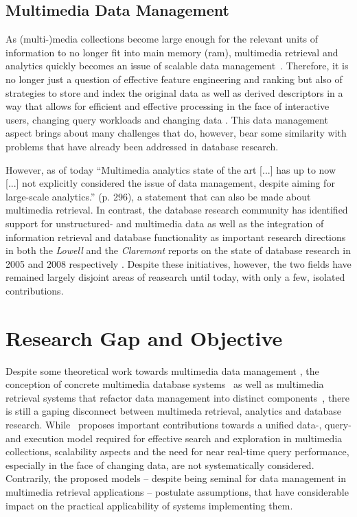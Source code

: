 \subsection{Multimedia Data Management}

As (multi-)media collections become large enough for the relevant units of information to no longer fit into main memory (\acrshort{ram}), multimedia retrieval and analytics quickly becomes an issue of scalable data management~\cite{Jonson:2016Ten,Pouyanfar:2018}. Therefore, it is no longer just a question of effective feature engineering and ranking but also of strategies to store and index the original data as well as derived descriptors in a way that allows for efficient and effective processing in the face of interactive users, changing query workloads and changing data \cite{Smeulders:2000Content}. This data management aspect brings about many challenges that do, however, bear some similarity with problems that have already been addressed in database research.

However, as of today ``Multimedia analytics state of the art [...] has up to now [...] not explicitly considered the issue of data management, despite aiming for large-scale analytics.'' \cite{Jonson:2016Ten} (p. 296), a statement that can also be made about multimedia retrieval. In contrast, the database research community has identified support for unstructured- and multimedia data as well as the integration of information retrieval and database functionality as important research directions in both the \emph{Lowell} and the \emph{Claremont} reports on the state of database research in 2005 and 2008 respectively \cite{Abiteboul:2005Lowell,Agrawal:2008Claremont}. Despite these initiatives, however, the two fields have remained largely disjoint areas of reasearch until today, with only a few, isolated contributions.

\section{Research Gap and Objective}
\label{section:research_gap}

Despite some theoretical work towards multimedia data management \cite{Marcus:1996Foundations,Adjeroh:1997Multimedia}, the conception of concrete multimedia database systems~\cite{Giangreco:2016Adam,Yang:2020Pase,Wang:2021Milvus} as well as multimedia retrieval systems that refactor data management into distinct components~\cite{Carey:1995Towards,Rossetto:2016vitrivr,Gasser:2019Multimodal}, there is still a gaping disconnect between multimeda retrieval, analytics and database research. While~\cite{Giangreco:2018Database} proposes important contributions towards a unified data-, query- and execution model required for effective search and exploration in multimedia collections, scalability aspects and the need for near real-time query performance, especially in the face of changing data, are not systematically considered. Contrarily, the proposed models -- despite being seminal for data management in multimedia retrieval applications -- postulate assumptions, that have considerable impact on the practical applicability of systems implementing them.

